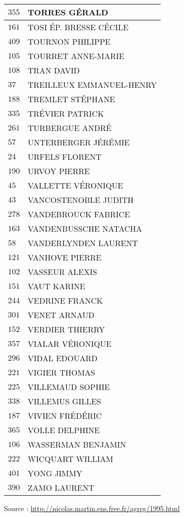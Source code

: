 \begin{xltabular}{\linewidth}{|l|X|}
    \hline
    $355$ & TORRES GÉRALD \\
    \hline
    $161$ & TOSI ÉP. BRESSE CÉCILE \\
    \hline
    $409$ & TOURNON PHILIPPE \\
    \hline
    $105$ & TOURRET ANNE-MARIE \\
    \hline
    $108$ & TRAN DAVID \\
    \hline
    $37$ & TREILLEUX EMMANUEL-HENRY \\
    \hline
    $188$ & TREMLET STÉPHANE \\
    \hline
    $335$ & TRÉVIER PATRICK \\
    \hline
    $261$ & TURBERGUE ANDRÉ \\
    \hline
    $57$ & UNTERBERGER JÉRÉMIE \\
    \hline
    $24$ & URFELS FLORENT \\
    \hline
    $190$ & URVOY PIERRE \\
    \hline
    $45$ & VALLETTE VÉRONIQUE \\
    \hline
    $43$ & VANCOSTENOBLE JUDITH \\
    \hline
    $278$ & VANDEBROUCK FABRICE \\
    \hline
    $163$ & VANDENBUSSCHE NATACHA \\
    \hline
    $58$ & VANDERLYNDEN LAURENT \\
    \hline
    $121$ & VANHOVE PIERRE \\
    \hline
    $102$ & VASSEUR ALEXIS \\
    \hline
    $151$ & VAUT KARINE \\
    \hline
    $244$ & VEDRINE FRANCK \\
    \hline
    $301$ & VENET ARNAUD \\
    \hline
    $152$ & VERDIER THIERRY \\
    \hline
    $357$ & VIALAR VÉRONIQUE \\
    \hline
    $296$ & VIDAL EDOUARD \\
    \hline
    $221$ & VIGIER THOMAS \\
    \hline
    $225$ & VILLEMAUD SOPHIE \\
    \hline
    $338$ & VILLEMUS GILLES \\
    \hline
    $187$ & VIVIEN FRÉDÉRIC \\
    \hline
    $365$ & VOLLE DELPHINE \\
    \hline
    $106$ & WASSERMAN BENJAMIN \\
    \hline
    $222$ & WICQUART WILLIAM \\
    \hline
    $401$ & YONG JIMMY \\
    \hline
    $390$ & ZAMO LAURENT \\
    \hline
  \end{xltabular}

  \begin{flushright}
    {\tiny Source : \url{http://nicolas.martin.ens.free.fr/agreg/1995.html}}
  \end{flushright}

